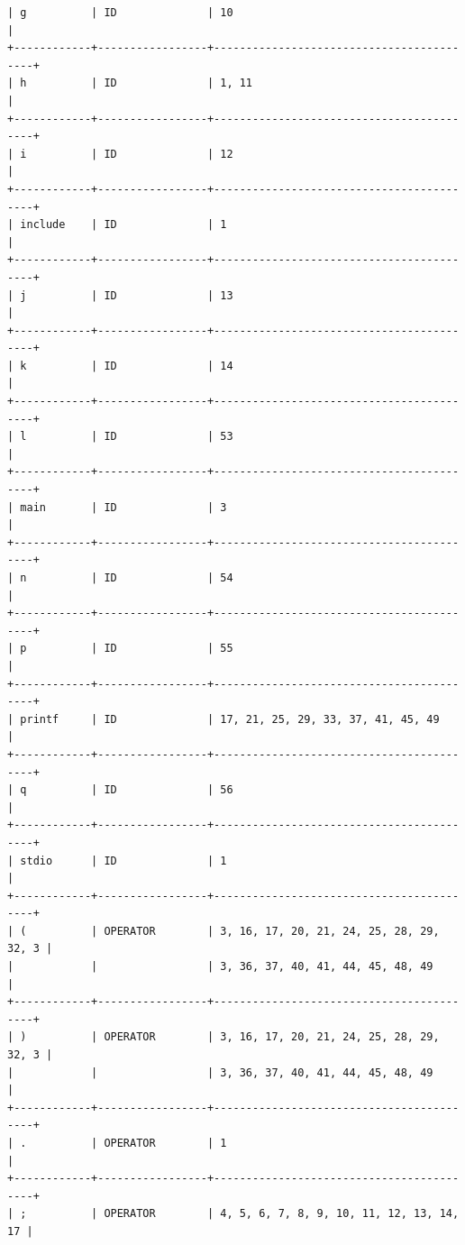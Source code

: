 \documentclass[a4paper,12pt]{article}
\begin{document}
\begin{flushleft}
\begin{verbatim}
| g          | ID              | 10                                       |
+------------+-----------------+------------------------------------------+
| h          | ID              | 1, 11                                    |
+------------+-----------------+------------------------------------------+
| i          | ID              | 12                                       |
+------------+-----------------+------------------------------------------+
| include    | ID              | 1                                        |
+------------+-----------------+------------------------------------------+
| j          | ID              | 13                                       |
+------------+-----------------+------------------------------------------+
| k          | ID              | 14                                       |
+------------+-----------------+------------------------------------------+
| l          | ID              | 53                                       |
+------------+-----------------+------------------------------------------+
| main       | ID              | 3                                        |
+------------+-----------------+------------------------------------------+
| n          | ID              | 54                                       |
+------------+-----------------+------------------------------------------+
| p          | ID              | 55                                       |
+------------+-----------------+------------------------------------------+
| printf     | ID              | 17, 21, 25, 29, 33, 37, 41, 45, 49       |
+------------+-----------------+------------------------------------------+
| q          | ID              | 56                                       |
+------------+-----------------+------------------------------------------+
| stdio      | ID              | 1                                        |
+------------+-----------------+------------------------------------------+
| (          | OPERATOR        | 3, 16, 17, 20, 21, 24, 25, 28, 29, 32, 3 |
|            |                 | 3, 36, 37, 40, 41, 44, 45, 48, 49        |
+------------+-----------------+------------------------------------------+
| )          | OPERATOR        | 3, 16, 17, 20, 21, 24, 25, 28, 29, 32, 3 |
|            |                 | 3, 36, 37, 40, 41, 44, 45, 48, 49        |
+------------+-----------------+------------------------------------------+
| .          | OPERATOR        | 1                                        |
+------------+-----------------+------------------------------------------+
| ;          | OPERATOR        | 4, 5, 6, 7, 8, 9, 10, 11, 12, 13, 14, 17 |

\end{verbatim}
\end{flushleft}
\end{document}
